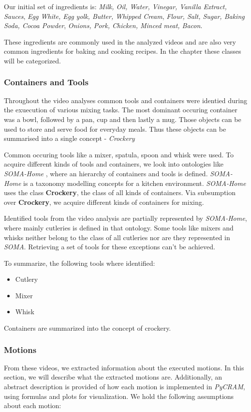 Our initial set of ingredients is: \textit{Milk, Oil, Water, Vinegar, Vanilla Extract, Sauces}, \textit{Egg White, Egg yolk, Butter, Whipped Cream}, \textit{Flour, Salt, Sugar, Baking Soda, Cocoa Powder},
\textit{Onions, Pork, Chicken, Minced meat, Bacon}.

These ingredients are commonly used in the analyzed videos and are also very common ingredients for baking and cooking recipes.
In the chapter  these classes will be categorized.

\subsubsection{Containers and Tools}
\label{sec:ContainersAndToolsAcquisition}
Throughout the video analyses common tools and containers were identied during the exuecution of various mixing tasks.
The most dominant occuring container was a bowl, followed by a pan, cup and then lastly a mug.
Those objects can be used to store and serve food for everyday meals. Thus these objects can be summarised 
into a single concept - \textit{Crockery} \cite{crockery}

Common occuring tools like a mixer, spatula, spoon and whisk were used. 
To acquire different kinds of tools and containers, we look into ontologies like \textit{SOMA-Home} \cite{soma},
where an hierarchy of containers and tools is defined. \textit{SOMA-Home} is a taxonomy modelling concepts for a kitchen environment. 
\textit{SOMA-Home} uses the class \textbf{Crockery}, the class of all kinds of containers.
Via subsumption over \textbf{Crockery}, we acquire different kinds of containers for mixing.

Identified tools from the video analysis are partially represented by \textit{SOMA-Home}, where mainly cutleries is defined in that ontology.
Some tools like mixers and whisks neither belong to the class of all cutleries nor are they represented in \textit{SOMA}. Retrieving a set of tools
for these exceptions can't be achieved.

To summarize, the following tools where identified: 
\begin{itemize}
  \item Cutlery
  \item Mixer
  \item Whisk
\end{itemize}

Containers are summarized into the concept of crockery. 
\subsubsection{Motions}
\label{sec:Motions}
From these videos, we extracted information about the executed motions. In this section, we will describe what the extracted motions are. 
Additionally, an abstract description is provided of how each motion is implemented in \textit{PyCRAM}, using formulas and plots for visualization.
We hold the following assumptions about each motion:

